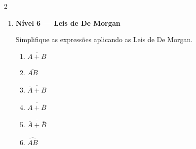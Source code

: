 \documentclass[a4paper,12pt]{article}
\begin{document}
\begin{multicols}{2}
\begin{enumerate}[leftmargin=*]
\begin{enumerate}[label=(\Alph*)]

    \item $(A+B)(A+\overline{B})$

    \item $(A+B)(A+C)$

    \item $(A+B)(A+BC)$

    \item $(A+B)(A+\overline{B}+C)$

    \item $(A+B)(\overline{A}+B)$

    \item $(A+B)(\overline{A}+C)$

    \item $A(B+\overline{B}+C)$

    \item $(A+\overline{B})(A+B)$

    \item $(A+B)(A+B+C)$

    \item $(A+B)(A+B\overline{C})$

\end{enumerate}

\vspace{0.4cm}


\item \textbf{Nível 6 — Leis de De Morgan}

Simplifique as expressões aplicando as Leis de De Morgan.

\begin{enumerate}[label=(\Alph*)]

    \item $\overline{A+B}$

    \item $\overline{AB}$

    \item $\overline{\overline{A}+B}$

    \item $\overline{A+\overline{B}}$

    \item $\overline{\overline{A}+\overline{B}}$

    \item $\overline{\overline{A}\overline{B}}$


\end{enumerate}
\end{enumerate}
\end{multicols}
\end{document}
